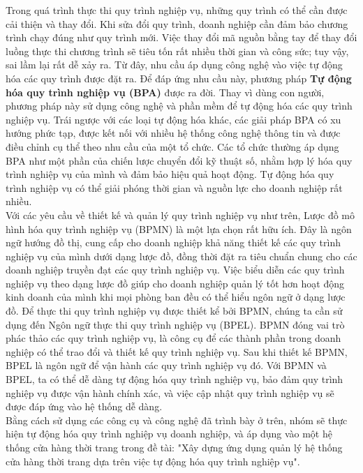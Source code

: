 Trong quá trình thực thi quy trình nghiệp vụ, những quy trình có thể cần được cải thiện và thay đổi. Khi sửa đổi quy trình, doanh nghiệp cần đảm bảo chương trình chạy đúng như quy trình mới. Việc thay đổi mã nguồn bằng tay để thay đổi luồng thực thi chương trình sẽ tiêu tốn rất nhiều thời gian và công sức; tuy vậy, sai lầm lại rất dễ xảy ra. Từ đây, nhu cầu áp dụng công nghệ vào việc tự động hóa các quy trình được đặt ra. Để đáp ứng nhu cầu này, phương pháp \textbf{Tự động hóa quy trình nghiệp vụ (BPA)} được ra đời. Thay vì dùng con người, phương pháp này sử dụng công nghệ và phần mềm để tự động hóa các quy trình nghiệp vụ. Trái ngược với các loại tự động hóa khác, các giải pháp BPA có xu hướng phức tạp, được kết nối với nhiều hệ thống công nghệ thông tin  và được điều chỉnh cụ thể theo nhu cầu của một tổ chức. Các tổ chức thường áp dụng BPA như một phần của chiến lược chuyển đổi kỹ thuật số, nhằm hợp lý hóa quy trình nghiệp vụ của mình và đảm bảo hiệu quả hoạt động. Tự động hóa quy trình nghiệp vụ có thể giải phóng thời gian và nguồn lực cho doanh nghiệp rất nhiều.\\

Với các yêu cầu về thiết kế và quản lý quy trình nghiệp vụ như trên, Lược đồ mô hình hóa quy trình nghiệp vụ (BPMN) là một lựa chọn rất hữu ích. Đây là ngôn ngữ hướng đồ thị, cung cấp cho doanh nghiệp khả năng thiết kế các quy trình nghiệp vụ của mình dưới dạng lược đồ, đồng thời đặt ra tiêu chuẩn chung cho các doanh nghiệp truyền đạt các quy trình nghiệp vụ. Việc biểu diễn các quy trình nghiệp vụ theo dạng lược đồ giúp cho doanh nghiệp quản lý tốt hơn hoạt động kinh doanh của mình khi mọi phòng ban đều có thể hiểu ngôn ngữ ở dạng lược đồ. Để thực thi quy trình nghiệp vụ được thiết kể bởi BPMN, chúng ta cần sử dụng đến Ngôn ngữ thực thi quy trình nghiệp vụ (BPEL). BPMN đóng vai trò phác thảo các quy trình nghiệp vụ, là công cụ để các thành phần trong doanh nghiệp có thể trao đổi và thiết kế quy trình nghiệp vụ. Sau khi thiết kế BPMN, BPEL là ngôn ngữ để vận hành các quy trình nghiệp vụ đó. Với BPMN và BPEL, ta có thể dễ dàng tự động hóa quy trình nghiệp vụ, bảo đảm quy trình nghiệp vụ được vận hành chính xác, và việc cập nhật quy trình nghiệp vụ sẽ được đáp ứng vào hệ thống dễ dàng.\\

Bằng cách sử dụng các công cụ và công nghệ đã trình bày ở trên, nhóm sẽ thực hiện tự động hóa quy trình nghiệp vụ doanh nghiệp, và áp dụng vào một hệ thống cửa hàng thời trang trong đề tài: "Xây dựng ứng dụng quản lý hệ thống cửa hàng thời trang dựa trên việc tự động hóa quy trình nghiệp vụ".

